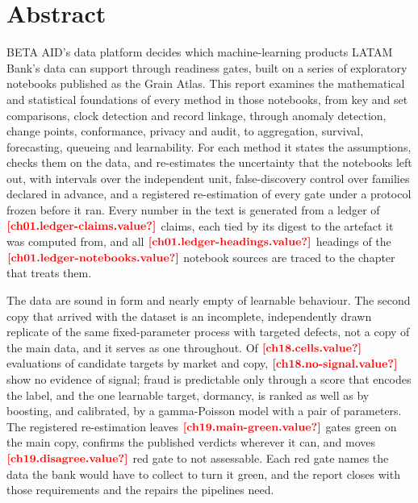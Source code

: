 \chapter*{Abstract}

BETA AID's data platform decides which machine-learning products LATAM Bank's data can support through readiness
gates, built on a series of exploratory notebooks published as the Grain Atlas. This report examines the mathematical
and statistical foundations of every method in those notebooks, from key and set comparisons, clock detection and
record linkage, through anomaly detection, change points, conformance, privacy and audit, to aggregation, survival,
forecasting, queueing and learnability. For each method it states the assumptions, checks them on the data, and
re-estimates the uncertainty that the notebooks left out, with intervals over the independent unit, false-discovery
control over families declared in advance, and a registered re-estimation of every gate under a protocol frozen before
it ran. Every number in the text is generated from a ledger of $\est{ch01.ledger-claims}{value}$ claims, each tied by
its digest to the artefact it was computed from, and all $\est{ch01.ledger-headings}{value}$ headings of the
$\est{ch01.ledger-notebooks}{value}$ notebook sources are traced to the chapter that treats them.

The data are sound in form and nearly empty of learnable behaviour. The second copy that arrived with the dataset is an
incomplete, independently drawn replicate of the same fixed-parameter process with targeted defects, not a copy of the
main data, and it serves as one throughout. Of $\est{ch18.cells}{value}$ evaluations of candidate targets by market and copy,
$\est{ch18.no-signal}{value}$ show no evidence of signal; fraud is predictable only through a score that encodes the
label, and the one learnable target, dormancy, is ranked as well as by boosting, and calibrated, by a gamma-Poisson
model with a pair of parameters. The registered re-estimation leaves $\est{ch19.main-green}{value}$ gates green on the
main copy, confirms the published verdicts wherever it can, and moves $\est{ch19.disagree}{value}$ red gate to not
assessable. Each red gate names the data the bank would have to collect to turn it green, and the report closes with
those requirements and the repairs the pipelines need.
